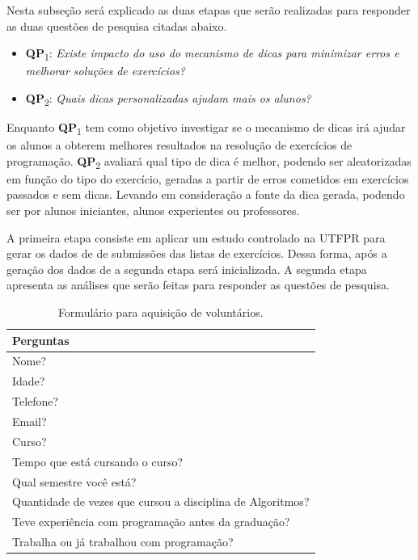 Nesta subseção será explicado as duas etapas que serão realizadas para responder as duas questões de pesquisa citadas abaixo.

\begin{itemize}
	\item \textbf{QP}\textsubscript{1}: 
	\textit{Existe impacto do uso do mecanismo de dicas para minimizar erros e melhorar soluções de exercícios?}
	\foreign
	\item \textbf{QP}\textsubscript{2}: 
	\textit{Quais dicas personalizadas ajudam mais os alunos?}
\end{itemize}

Enquanto \textbf{QP}\textsubscript{1} tem como objetivo investigar se o mecanismo de dicas irá ajudar os alunos a obterem melhores resultados na resolução de exercícios de programação. \textbf{QP}\textsubscript{2} avaliará qual tipo de dica é melhor, podendo ser aleatorizadas em função do tipo do exercício, geradas a partir de erros cometidos em exercícios passados e sem dicas. Levando em consideração a fonte da dica gerada, podendo ser por alunos iniciantes, alunos experientes ou professores.

A primeira etapa consiste em aplicar um estudo controlado na UTFPR para gerar os dados de  de submissões das listas de exercícios. Dessa forma, após a geração dos dados de  a segunda etapa será inicializada. A segunda etapa apresenta as análises que serão feitas para responder as questões de pesquisa.

\begin{table}[]
	\centering
	\captionsetup{justification=centering}
	\caption{Formulário para aquisição de voluntários.}
	\label{tabela:formulário}
	\begin{tabular}{l}
		\hline
		Perguntas                        \\ \hline
		Nome?                            \\
		Idade?                           \\
		Telefone?                        \\
		Email?                           \\
		Curso?                           \\
		Tempo que está cursando o curso? \\
		Qual semestre você está?         \\ 
		Quantidade de vezes que cursou a disciplina de Algoritmos?  \\ 
		Teve experiência com programação antes da graduação? \\
		Trabalha ou já trabalhou com programação? \\ \hline
	\end{tabular}
\end{table}


